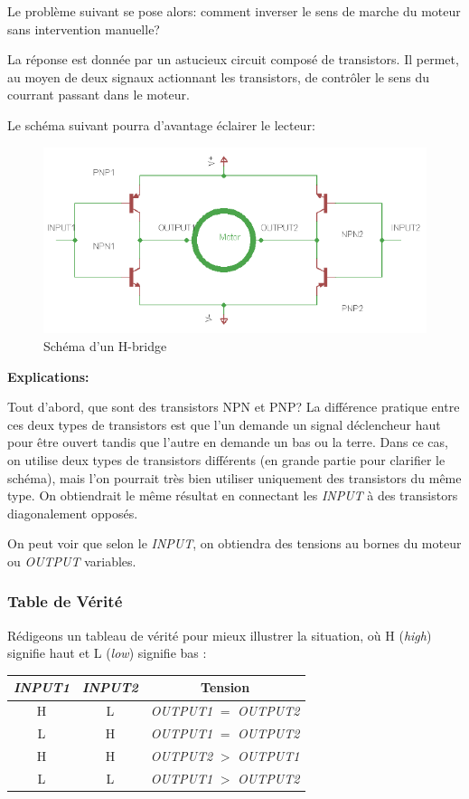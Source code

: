 \documentclass[a4paper,12pt]{article}
\begin{document}
{Le probl\`eme suivant se pose alors: comment inverser le sens de marche du
moteur sans intervention manuelle?

La r\'eponse est donn\'ee par un astucieux circuit compos\'e de
transistors. Il permet, au moyen de deux signaux actionnant les transistors,
de contr\^oler le sens du courrant passant dans le moteur.

Le sch\'ema suivant pourra d'avantage \'eclairer le lecteur:

\begin{figure}[h]
\centering
\includegraphics[width=1.0\textwidth]{figures/H-bridge}
    \caption{\label{H-bridge}Sch\'ema d'un H-bridge}
\end{figure}

\textbf{Explications:}

Tout d'abord, que sont des transistors NPN et PNP? La diff\'erence pratique
entre ces deux types de transistors est que l'un demande un signal
d\'eclencheur haut pour \^etre ouvert tandis que l'autre en demande un
bas ou la terre. Dans ce cas, on utilise deux types de transistors
diff\'erents (en grande partie pour clarifier le sch\'ema), mais l'on pourrait
tr\`es bien utiliser uniquement des transistors du m\^eme type. On obtiendrait
le m\^eme r\'esultat en connectant les \emph{INPUT} \`a des transistors
diagonalement oppos\'es\cite{RobotRoom}.

On peut voir que selon le \emph{INPUT}, on obtiendra des tensions au bornes du
moteur ou \emph{OUTPUT} variables.
\subsubsection{Table de V\'erit\'e}
R\'edigeons un tableau de v\'erit\'e pour mieux illustrer la situation, o\`u H
(\textit{high}) signifie haut et L (\textit{low}) signifie bas :
\clearpage

\begin{table}%
\begin{center}
  \begin{tabular}{c|c||c}  
    \emph{INPUT1} & \emph{INPUT2}
    & Tension\\
    \hline
    H & L & \emph{OUTPUT1} $=$ \emph{OUTPUT2}\\
    L & H & \emph{OUTPUT1} $=$ \emph{OUTPUT2}\\
    H & H & \emph{OUTPUT2} $>$ \emph{OUTPUT1}\\
    L & L & \emph{OUTPUT1} $>$ \emph{OUTPUT2}\\
  \end{tabular}
\end{center}


\end{table}}
\end{document}
